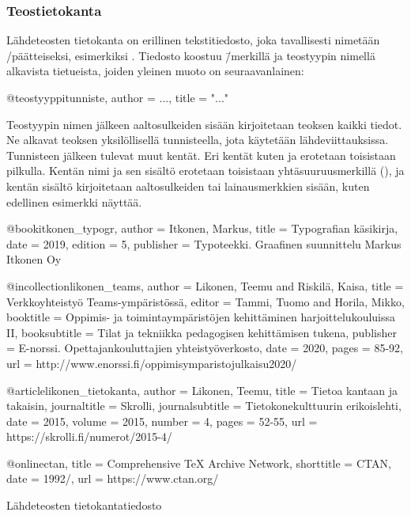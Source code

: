 \subsubsection{Teostietokanta}

Lähdeteosten tietokanta on erillinen tekstitiedosto, joka tavallisesti
nimetään \-/päätteiseksi, esimerkiksi .
Tiedosto koostuu \=/merkillä ja teostyypin nimellä alkavista
tietueista, joiden yleinen muoto on seuraavanlainen:

\begin{koodilohkosis}
@teostyyppi{tunniste,
  author = {...},
  title = "..."
}
\end{koodilohkosis}

Teostyypin nimen jälkeen aaltosulkeiden sisään kirjoitetaan teoksen
kaikki tiedot. Ne alkavat teoksen yksilöllisellä tunnisteella, jota
käytetään lähdeviittauksissa. Tunnisteen jälkeen tulevat muut kentät.
Eri kentät kuten  ja  erotetaan toisistaan
pilkulla. Kentän nimi ja sen sisältö erotetaan toisistaan
yhtäsuuruusmerkillä (\koodi{=}), ja kentän sisältö kirjoitetaan
aaltosulkeiden tai lainausmerkkien sisään, kuten edellinen esimerkki
näyttää.

\begin{esimerkki*}
\begin{koodilohko}
@book{itkonen_typogr,
  author = {Itkonen, Markus},
  title = {Typografian käsikirja},
  date = {2019},
  edition = {5},
  publisher = {Typoteekki. Graafinen suunnittelu Markus Itkonen Oy}
}

@incollection{likonen_teams,
  author = {Likonen, Teemu and Riskilä, Kaisa},
  title = {Verkkoyhteistyö Teams-ympäristössä},
  editor = {Tammi, Tuomo and Horila, Mikko},
  booktitle = {Oppimis- ja toimintaympäristöjen kehittäminen
    harjoittelukouluissa II},
  booksubtitle = {Tilat ja tekniikka pedagogisen kehittämisen tukena},
  publisher = {E-norssi. Opettajankouluttajien yhteistyöverkosto},
  date = {2020},
  pages = {85-92},
  url = {http://www.enorssi.fi/oppimisymparistojulkaisu2020/}
}

@article{likonen_tietokanta,
  author = {Likonen, Teemu},
  title = {Tietoa kantaan ja takaisin},
  journaltitle = {Skrolli},
  journalsubtitle = {Tietokonekulttuurin erikoislehti},
  date = {2015},
  volume = {2015},
  number = {4},
  pages = {52-55},
  url = {https://skrolli.fi/numerot/2015-4/}
}

@online{ctan,
  title = {Comprehensive TeX Archive Network},
  shorttitle = {CTAN},
  date = {1992/},
  url = {https://www.ctan.org/}
}
\end{koodilohko}
  \caption{Lähdeteosten tietokantatiedosto}
  \label{esim/bib-tiedosto}
\end{esimerkki*}

